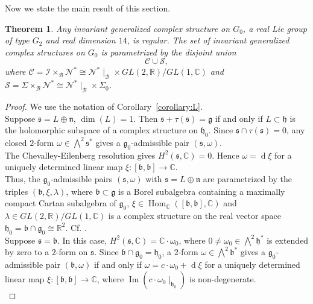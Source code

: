 \documentclass[10pt]{article}
\newtheorem{theorem}{Theorem}[section]
\begin{document}
Now we state the main result of this section.

\begin{theorem}
Any invariant generalized complex structure on $G_0$, a real Lie group of type $G_2$ and real dimension $14$, is regular. The set of invariant generalized complex structures on $G_0$ is parametrized by the disjoint union
$$
\mathcal{C}\cup \mathcal{S},
$$
where $\mathcal{C}=\mathcal{I}\times_{\mathcal{B}}\mathcal{N}^{*}\cong \mathcal{N}^{*}{\mid}_{\mathcal{B}}\times GL(2,\mathbb R)/GL(1,\mathbb C)$ and $\mathcal{S}={\Sigma}\times_{\mathcal{B}}\mathcal{N}^{*}\cong \mathcal{N}^{*}{\mid}_{\mathcal{B}}\times {\Sigma}_0$.
\end{theorem}

\begin{proof}

We use the notation of Corollary~\ref{corollary:L}.\\

Suppose $\mathfrak{s}=L\oplus \mathfrak{n}$, $\operatorname{dim}(L)=1$. Then $\mathfrak{s}+\tau (\mathfrak{s})=\mathfrak{g}$ if and only if $L\subset \mathfrak{h}$ is the holomorphic subspace of a complex structure on $\mathfrak{h}_0$. Since $\mathfrak{s}\cap \tau (\mathfrak{s})=0$, any closed $2$-form $\omega \in \bigwedge ^2 {\mathfrak{s}}^{*}$ gives a $\mathfrak{g}_0$-admissible pair $(\mathfrak{s},\omega )$.\\

The Chevalley-Eilenberg resolution gives $H^2(\mathfrak{s},\mathbb C)=0$. Hence $\omega = \operatorname{d}\xi$ for a uniquely determined linear map $\xi \colon [\mathfrak{b},\mathfrak{b}]\to \mathbb C$.\\

Thus, the $\mathfrak{g}_0$-admissible pairs $(\mathfrak{s},\omega )$ with $\mathfrak{s}=L\oplus \mathfrak{n}$ are parametrized by the triples $(\mathfrak{b},\xi , \lambda)$, where $\mathfrak{b}\subset \mathfrak{g}$ is a Borel subalgebra containing a maximally compact Cartan subalgebra of $\mathfrak{g}_0$, $\xi \in \operatorname{Hom}_{\mathbb C}([\mathfrak{b},\mathfrak{b}],\mathbb C)$ and $\lambda \in GL(2,\mathbb R)/GL(1,\mathbb C)$ is a complex structure on the real vector space $\mathfrak{h}_0=\mathfrak{b}\cap \mathfrak{g}_0\cong {\mathbb R}^2$. Cf. \cite{Pittie}.\\

Suppose $\mathfrak{s}=\mathfrak{b}$. In this case, $H^2(\mathfrak{s},\mathbb C)=\mathbb C \cdot {\omega}_0$, where $0\neq {\omega}_0\in \bigwedge ^2 {\mathfrak{h}}^{*}$ is extended by zero to a $2$-form on $\mathfrak{s}$. Since $\mathfrak{b}\cap \mathfrak{g}_0=\mathfrak{h}_0$, a $2$-form $\omega\in \bigwedge ^2 {\mathfrak{b}}^{*}$ gives a $\mathfrak{g}_0$-admissible pair $(\mathfrak{b},\omega )$ if and only if $\omega = c\cdot {\omega}_0+\operatorname{d}\xi$ for a uniquely determined linear map $\xi \colon [\mathfrak{b},\mathfrak{b}]\to \mathbb C$, where $\operatorname{Im}(c\cdot \omega_0 {\mid}_{\mathfrak{h}_0})$ is non-degenerate.\\


\end{proof}
\end{document}
